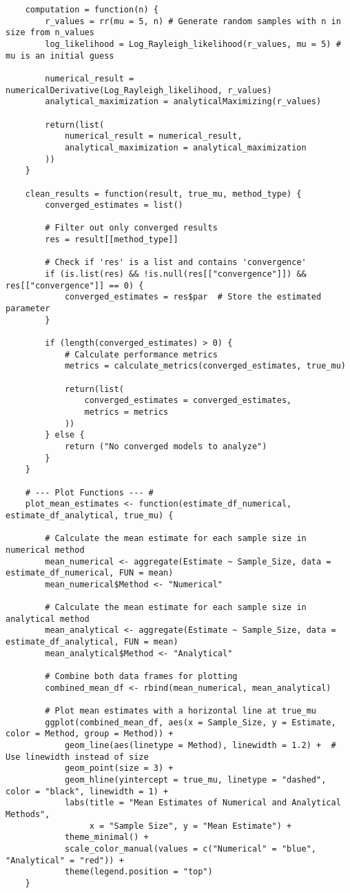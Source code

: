 \begin{verbatim}
    computation = function(n) {
        r_values = rr(mu = 5, n) # Generate random samples with n in size from n_values
        log_likelihood = Log_Rayleigh_likelihood(r_values, mu = 5) # mu is an initial guess

        numerical_result = numericalDerivative(Log_Rayleigh_likelihood, r_values)
        analytical_maximization = analyticalMaximizing(r_values)

        return(list(
            numerical_result = numerical_result, 
            analytical_maximization = analytical_maximization
        ))
    }

    clean_results = function(result, true_mu, method_type) {
        converged_estimates = list()

        # Filter out only converged results
        res = result[[method_type]]

        # Check if 'res' is a list and contains 'convergence'
        if (is.list(res) && !is.null(res[["convergence"]]) && res[["convergence"]] == 0) {
            converged_estimates = res$par  # Store the estimated parameter
        }

        if (length(converged_estimates) > 0) {
            # Calculate performance metrics
            metrics = calculate_metrics(converged_estimates, true_mu)

            return(list(
                converged_estimates = converged_estimates,
                metrics = metrics
            ))
        } else {
            return ("No converged models to analyze")
        }
    }

    # --- Plot Functions --- #
    plot_mean_estimates <- function(estimate_df_numerical, estimate_df_analytical, true_mu) {

        # Calculate the mean estimate for each sample size in numerical method
        mean_numerical <- aggregate(Estimate ~ Sample_Size, data = estimate_df_numerical, FUN = mean)
        mean_numerical$Method <- "Numerical"

        # Calculate the mean estimate for each sample size in analytical method
        mean_analytical <- aggregate(Estimate ~ Sample_Size, data = estimate_df_analytical, FUN = mean)
        mean_analytical$Method <- "Analytical"

        # Combine both data frames for plotting
        combined_mean_df <- rbind(mean_numerical, mean_analytical)

        # Plot mean estimates with a horizontal line at true_mu
        ggplot(combined_mean_df, aes(x = Sample_Size, y = Estimate, color = Method, group = Method)) +
            geom_line(aes(linetype = Method), linewidth = 1.2) +  # Use linewidth instead of size
            geom_point(size = 3) +
            geom_hline(yintercept = true_mu, linetype = "dashed", color = "black", linewidth = 1) +
            labs(title = "Mean Estimates of Numerical and Analytical Methods",
                 x = "Sample Size", y = "Mean Estimate") +
            theme_minimal() +
            scale_color_manual(values = c("Numerical" = "blue", "Analytical" = "red")) +
            theme(legend.position = "top")
    }


\end{verbatim}
